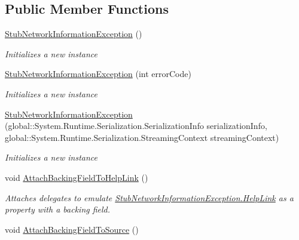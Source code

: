 \subsection*{Public Member Functions}
\begin{DoxyCompactItemize}
\item 
\hyperlink{class_system_1_1_net_1_1_network_information_1_1_fakes_1_1_stub_network_information_exception_a4f26f545b2da3b350566e5f37a53e0c9}{Stub\-Network\-Information\-Exception} ()
\begin{DoxyCompactList}\small\item\em Initializes a new instance\end{DoxyCompactList}\item 
\hyperlink{class_system_1_1_net_1_1_network_information_1_1_fakes_1_1_stub_network_information_exception_ab1a4eeb6e7175bc76b67f76b4ed25896}{Stub\-Network\-Information\-Exception} (int error\-Code)
\begin{DoxyCompactList}\small\item\em Initializes a new instance\end{DoxyCompactList}\item 
\hyperlink{class_system_1_1_net_1_1_network_information_1_1_fakes_1_1_stub_network_information_exception_a18d47a40a467ce0866ebab06b160818e}{Stub\-Network\-Information\-Exception} (global\-::\-System.\-Runtime.\-Serialization.\-Serialization\-Info serialization\-Info, global\-::\-System.\-Runtime.\-Serialization.\-Streaming\-Context streaming\-Context)
\begin{DoxyCompactList}\small\item\em Initializes a new instance\end{DoxyCompactList}\item 
void \hyperlink{class_system_1_1_net_1_1_network_information_1_1_fakes_1_1_stub_network_information_exception_a9d75c7ef62f8858404a44490575becc8}{Attach\-Backing\-Field\-To\-Help\-Link} ()
\begin{DoxyCompactList}\small\item\em Attaches delegates to emulate \hyperlink{class_system_1_1_net_1_1_network_information_1_1_fakes_1_1_stub_network_information_exception_afb197845d47a01c43680436556e5311c}{Stub\-Network\-Information\-Exception.\-Help\-Link} as a property with a backing field.\end{DoxyCompactList}\item 
void \hyperlink{class_system_1_1_net_1_1_network_information_1_1_fakes_1_1_stub_network_information_exception_a2283561fcfc57698c85ca339d4c8729d}{Attach\-Backing\-Field\-To\-Source} ()

\end{DoxyCompactItemize}
